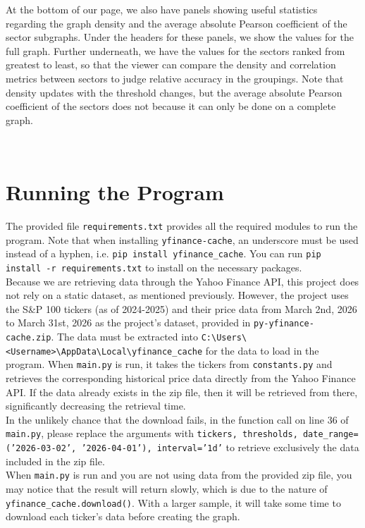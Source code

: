 \documentclass[fontsize=11pt]{article}
\begin{document}
At the bottom of our page, we also have panels showing useful statistics regarding the graph density and the average absolute Pearson coefficient of the sector subgraphs. Under the headers for these panels, we show the values for the full graph. Further underneath, we have the values for the sectors ranked from greatest to least, so that the viewer can compare the density and correlation metrics between sectors to judge relative accuracy in the groupings. Note that density updates with the threshold changes, but the average absolute Pearson coefficient of the sectors does not because it can only be done on a complete graph.


\\


\section*{Running the Program}
The provided file \texttt{requirements.txt} provides all the required modules to run the program. Note that when installing \texttt{yfinance-cache}, an underscore must be used instead of a hyphen, i.e. \texttt{pip install yfinance\_cache}. You can run \texttt{pip install -r requirements.txt} to install on the necessary packages.\\
Because we are retrieving data through the Yahoo Finance API, this project does not rely on a static dataset, as mentioned previously. However, the project uses the S\&P 100 tickers (as of 2024-2025) and their price data from March 2nd, 2026 to March 31st, 2026 as the project's dataset, provided in \texttt{py-yfinance-cache.zip}. The data must be extracted into \texttt{C:\textbackslash Users\textbackslash <Username>\textbackslash AppData\textbackslash Local\textbackslash yfinance\_cache} for the data to load in the program. When \texttt{main.py} is run, it takes the tickers from \texttt{constants.py} and retrieves the corresponding historical price data directly from the Yahoo Finance API. If the data already exists in the zip file, then it will be retrieved from there, significantly decreasing the retrieval time.\\
In the unlikely chance that the download fails, in the function call on line 36 of \texttt{main.py}, please replace the arguments with \texttt{tickers, thresholds, date\_range=('2026-03-02', '2026-04-01'), interval='1d'} to retrieve exclusively the data included in the zip file.\\
When \texttt{main.py} is run and you are not using data from the provided zip file, you may notice that the result will return slowly, which is due to the nature of \texttt{yfinance\_cache.download()}. With a larger sample, it will take some time to download each ticker's data before creating the graph.\\
\end{document}

